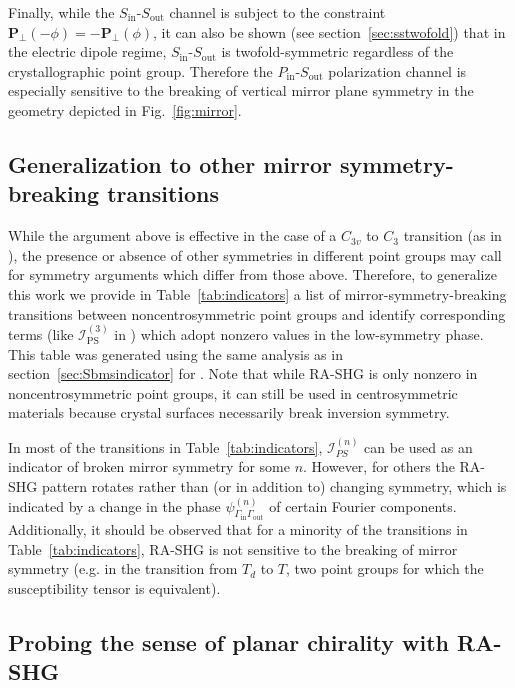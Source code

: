 Finally, while the $S_\mathrm{in}$-$S_\mathrm{out}$ channel is subject to the constraint $\bm{P}_\perp(-\phi) = -\bm{P}_\perp(\phi)$, it can also be shown (see section~\ref{sec:sstwofold}) that in the electric dipole regime, $S_\mathrm{in}$-$S_\mathrm{out}$ is twofold-symmetric regardless of the crystallographic point group.
Therefore the $P_\mathrm{in}$-$S_\mathrm{out}$ polarization channel is especially sensitive to the breaking of vertical mirror plane symmetry in the geometry depicted in Fig.~\ref{fig:mirror}.

\subsection{Generalization to other mirror symmetry-breaking transitions}

While the argument above is effective in the case of a $C_{3v}$ to $C_3$ transition (as in \tastwo), the presence or absence of other symmetries in different point groups may call for symmetry arguments which differ from those above.
Therefore, to generalize this work we provide in Table~\ref{tab:indicators} a list of mirror-symmetry-breaking transitions between noncentrosymmetric point groups and identify corresponding terms (like $\mathscr{I}_\mathrm{PS}^{(3)}$ in \tastwo) which adopt nonzero values in the low-symmetry phase.
This table was generated using the same analysis as in section~\ref{sec:Sbmsindicator} for \tastwo. 
Note that while RA-SHG is only nonzero in noncentrosymmetric point groups, it can still be used in centrosymmetric materials because crystal surfaces necessarily break inversion symmetry.

In most of the transitions in Table~\ref{tab:indicators}, $\mathscr{I}_{PS}^{(n)}$ can be used as an indicator of broken mirror symmetry for some $n$.
However, for others the RA-SHG pattern rotates rather than (or in addition to) changing symmetry, which is indicated by a change in the phase $\psi^{(n)}_{\Gamma_\mathrm{in}\Gamma_\mathrm{out}}$ of certain Fourier components.
Additionally, it should be observed that for a minority of the transitions in Table~\ref{tab:indicators}, RA-SHG is not sensitive to the breaking of mirror symmetry (e.g. in the transition from $T_d$ to $T$, two point groups for which the susceptibility tensor is equivalent).

\subsection{Probing the sense of planar chirality with RA-SHG}
